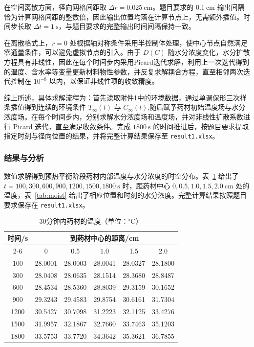 \documentclass[12pt,a4paper]{article}
\begin{document}
在空间离散方面，径向网格间距取 \(\Delta r=0.025\ \mathrm{cm}\)。题目要求的 \(0.1\ \mathrm{cm}\) 输出间隔恰为计算网格间距的整数倍，因此输出位置均落在计算节点上，无需额外插值。时间步长取 \(\Delta t=1\ \mathrm{s}\)，与题目要求的完整输出时间间隔保持一致。

在离散格式上，\(r=0\) 处根据轴对称条件采用半控制体处理，使中心节点自然满足零通量条件，可以避免虚拟节点的引入。由于 \(D(C)\) 随水分浓度变化，水分扩散方程具有非线性，因此在每个时间步内采用Picard迭代求解，利用上一次迭代得到的温度、含水率等变量更新材料物性参数，并反复求解耦合方程，直至相邻两次迭代控制在 \(10^{-8}\) 以内，以保证非线性项的收敛精度。

综上所述，具体求解流程为：首先读取附件1中的环境数据，通过单调保形三次样条插值得到连续的环境条件 \(T_\infty(t)\) 与 \(C_\infty(t)\),随后赋予药材初始温度场与水分浓度场。在每个时间步内，分别求解水分浓度场和温度场，并对非线性扩散系数进行 Picard 迭代，直至满足收敛条件。完成 \(1800\ \mathrm{s}\) 的时间推进后，按题目要求提取指定时刻与径向位置的结果，并将完整计算结果保存至 \texttt{result1.xlsx}。

\subsubsection{结果与分析}

数值求解得到预热平衡阶段药材内部温度与水分浓度的时空分布。表~\ref{tab:temp} 给出了
\(t=100,300,600,900,1200,1500,1800\ \mathrm{s}\) 时，距药材中心
\(0,0.5,1.0,1.5,2.0\ \mathrm{cm}\) 处的温度，表~\ref{tab:moist} 给出了相应位置和时刻的水分浓度。完整计算结果按照题目要求保存在 \texttt{result1.xlsx}。

\begin{table}[htbp]
\centering
\caption{30分钟内药材的温度（单位：\(^\circ\mathrm{C}\)）}
\label{tab:temp}
\begin{tabular}{cccccc}
\toprule
时间/s & \multicolumn{5}{c}{到药材中心的距离/cm} \\
\cmidrule(lr){2-6}
 & 0 & 0.5 & 1.0 & 1.5 & 2.0 \\
\midrule
100  & 28.0001 & 28.0003 & 28.0041 & 28.0327 & 28.1800 \\
300  & 28.0408 & 28.0635 & 28.1514 & 28.3680 & 28.8487 \\
600  & 28.4534 & 28.5360 & 28.8039 & 29.3159 & 30.1652 \\
900  & 29.3243 & 29.4583 & 29.8754 & 30.6161 & 31.7304 \\
1200 & 30.5427 & 30.7098 & 31.2223 & 32.1125 & 33.4276 \\
1500 & 31.9957 & 32.1867 & 32.7660 & 33.7463 & 35.1203 \\
1800 & 33.5753 & 33.7720 & 34.3642 & 35.3621 & 36.7855 \\
\bottomrule
\end{tabular}
\end{table}
\end{document}

